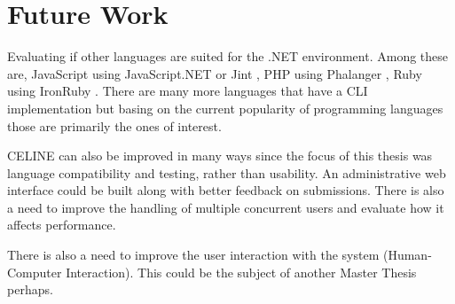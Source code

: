\section{Future Work}

Evaluating if other languages are suited for the .NET environment. Among these are, JavaScript using JavaScript.NET \cite{JavaScript.NET} or Jint \cite{Jint}, PHP using Phalanger \cite{Phalanger}, Ruby using IronRuby \cite{IronRuby}. There are many more languages that have a CLI implementation but basing on the current popularity of programming languages \cite{Tiobe} those are primarily the ones of interest.

CELINE can also be improved in many ways since the focus of this thesis was language compatibility and testing, rather than usability. An administrative web interface could be built along with better feedback on submissions. There is also a need to improve the handling of multiple concurrent users and evaluate how it affects performance.

There is also a need to improve the user interaction with the system (Human-Computer Interaction). This could be the subject of another Master Thesis perhaps.
